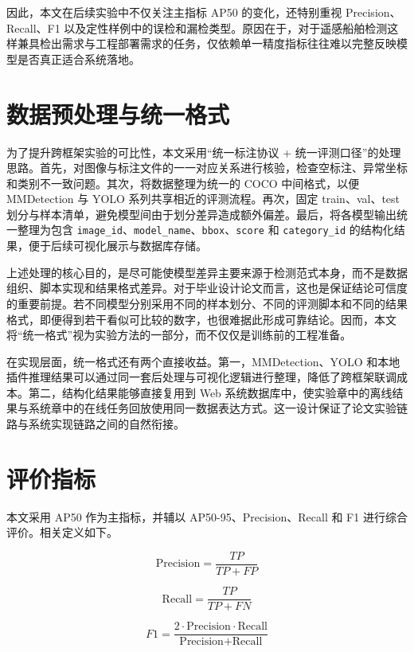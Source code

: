因此，本文在后续实验中不仅关注主指标 AP50 的变化，还特别重视 Precision、Recall、F1 以及定性样例中的误检和漏检类型。原因在于，对于遥感船舶检测这样兼具检出需求与工程部署需求的任务，仅依赖单一精度指标往往难以完整反映模型是否真正适合系统落地。

\section{数据预处理与统一格式}

为了提升跨框架实验的可比性，本文采用“统一标注协议 + 统一评测口径”的处理思路。首先，对图像与标注文件的一一对应关系进行核验，检查空标注、异常坐标和类别不一致问题。其次，将数据整理为统一的 COCO 中间格式，以便 MMDetection 与 YOLO 系列共享相近的评测流程。再次，固定 train、val、test 划分与样本清单，避免模型间由于划分差异造成额外偏差。最后，将各模型输出统一整理为包含 \texttt{image\_id}、\texttt{model\_name}、\texttt{bbox}、\texttt{score} 和 \texttt{category\_id} 的结构化结果，便于后续可视化展示与数据库存储。

上述处理的核心目的，是尽可能使模型差异主要来源于检测范式本身，而不是数据组织、脚本实现和结果格式差异。对于毕业设计论文而言，这也是保证结论可信度的重要前提。若不同模型分别采用不同的样本划分、不同的评测脚本和不同的结果格式，即便得到若干看似可比较的数字，也很难据此形成可靠结论。因而，本文将“统一格式”视为实验方法的一部分，而不仅仅是训练前的工程准备。

在实现层面，统一格式还有两个直接收益。第一，MMDetection、YOLO 和本地插件推理结果可以通过同一套后处理与可视化逻辑进行整理，降低了跨框架联调成本。第二，结构化结果能够直接复用到 Web 系统数据库中，使实验章中的离线结果与系统章中的在线任务回放使用同一数据表达方式。这一设计保证了论文实验链路与系统实现链路之间的自然衔接。

\section{评价指标}

本文采用 AP50 作为主指标，并辅以 AP50-95、Precision、Recall 和 F1 进行综合评价。相关定义如下。

\begin{equation}
\text{Precision} = \frac{TP}{TP + FP}
\end{equation}

\begin{equation}
\text{Recall} = \frac{TP}{TP + FN}
\end{equation}

\begin{equation}
F1 = \frac{2 \cdot \text{Precision} \cdot \text{Recall}}{\text{Precision} + \text{Recall}}
\end{equation}

